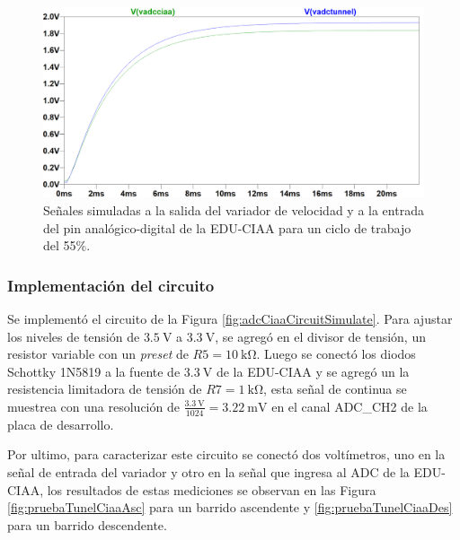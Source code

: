 \begin{figure}[H]
    \centering
    \includegraphics[width=1\linewidth]{Figuras/datalogger/Hardware/adc55PercentPwm.png}
    \caption{Señales simuladas a la salida del variador de velocidad y a la entrada del pin analógico-digital de la EDU-CIAA para un ciclo de trabajo del 55\%.}
    \label{fig:adc55PercentPwm}
\end{figure}

\subsubsection{Implementación del circuito}

Se implementó el circuito de la Figura \ref{fig:adcCiaaCircuitSimulate}. Para ajustar los niveles de tensión de $\SI{3.5}{\volt}$ a $\SI{3.3}{\volt}$, se agregó en el divisor de tensión, un resistor variable con un \textit{preset} de $R5 = \SI{10}{\kilo\ohm}$. Luego se conectó los diodos Schottky 1N5819 \cite{1N5819_datasheet} a la fuente de $\SI{3.3}{\volt}$ de la EDU-CIAA y se agregó un la resistencia limitadora de tensión de $R7 = \SI{1}{\kilo\ohm}$, esta señal de continua se muestrea con una resolución  de $\frac{\SI{3.3}{\volt}}{1024} = \SI{3.22}{\milli\volt}$  en el canal ADC\_CH2 de la placa de desarrollo.


Por ultimo, para caracterizar este circuito se conectó dos voltímetros, uno en la señal de entrada del variador y otro en la señal que ingresa al ADC de la EDU-CIAA, los resultados de estas mediciones se observan en las Figura \ref{fig:pruebaTunelCiaaAsc} para un barrido ascendente y \ref{fig:pruebaTunelCiaaDes} para un barrido descendente.

